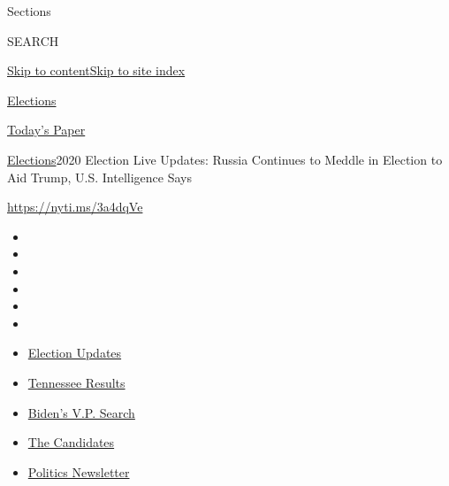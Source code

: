 Sections

SEARCH

\protect\hyperlink{site-content}{Skip to
content}\protect\hyperlink{site-index}{Skip to site index}

\href{https://www.nytimes3xbfgragh.onion/news-event/2020-election}{Elections}

\href{https://myaccount.nytimes3xbfgragh.onion/auth/login?response_type=cookie\&client_id=vi}{}

\href{https://www.nytimes3xbfgragh.onion/section/todayspaper}{Today's
Paper}

\href{/news-event/2020-election}{Elections}\textbar{}2020 Election Live
Updates: Russia Continues to Meddle in Election to Aid Trump, U.S.
Intelligence Says

\href{https://nyti.ms/3a4dqVe}{https://nyti.ms/3a4dqVe}

\begin{itemize}
\item
\item
\item
\item
\item
\item
\end{itemize}

\begin{itemize}
\item
  \href{https://www.nytimes3xbfgragh.onion/2020/08/07/us/elections/biden-vs-trump.html?action=click\&pgtype=Article\&state=default\&region=TOP_BANNER\&context=storylines_menu}{Election
  Updates}
\item
  \href{https://www.nytimes3xbfgragh.onion/interactive/2020/08/06/us/elections/results-tennessee-primary-elections.html?action=click\&pgtype=Article\&state=default\&region=TOP_BANNER\&context=storylines_menu}{Tennessee
  Results}
\item
  \href{https://www.nytimes3xbfgragh.onion/article/biden-vice-president-2020.html?action=click\&pgtype=Article\&state=default\&region=TOP_BANNER\&context=storylines_menu}{Biden's
  V.P. Search}
\item
  \href{https://www.nytimes3xbfgragh.onion/interactive/2019/us/politics/2020-presidential-candidates.html?action=click\&pgtype=Article\&state=default\&region=TOP_BANNER\&context=storylines_menu}{The
  Candidates}
\item
  \href{https://www.nytimes3xbfgragh.onion/newsletters/politics?action=click\&pgtype=Article\&state=default\&region=TOP_BANNER\&context=storylines_menu}{Politics
  Newsletter}
\end{itemize}

